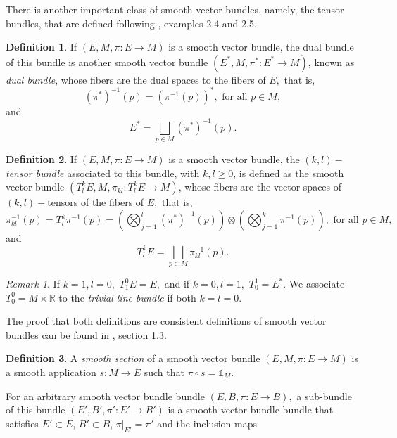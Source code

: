 \documentclass[12pt, letterpaper, reqno]{amsart}
\theoremstyle{definition}
\newtheorem{df}{Definition}
\theoremstyle{plain}
\theoremstyle{remark}
\newtheorem{rem}{Remark}
\begin{document}
There is another important class of smooth vector bundles, namely, the tensor bundles, that are defined following \cite{wendl2008lecture}, examples 2.4 and 2.5.
\begin{df} 
	If $ (E,M,\pi:E \rightarrow {M}) $ is a smooth vector bundle, the dual bundle of this bundle is another smooth vector bundle $ (E^*,M,\pi^*:E^*\rightarrow {M}) $, known as \textit{ dual bundle}, whose fibers are the dual spaces to the fibers of $ E, $ that is,
	$$ (\pi^{*})^{-1}(p)=(\pi^{-1}(p))^*, \text{ for all }p\in M,$$ 
	and $$ E^* =\bigsqcup_{p\in M} (\pi^*)^{-1}(p). $$ 
\end{df}
\begin{df}
	If $ (E,M,\pi:E \rightarrow {M}) $ is a smooth vector bundle, the \textit{$ (k,l)- $tensor bundle} associated to this bundle, with $ k,l\geq0 $, is defined as the smooth vector bundle $ (T^k_l E, M, \pi_{kl}: T^k_l E \rightarrow {M}) $, whose fibers are the vector spaces of $ (k,l) -$tensors of the fibers of $ E, $ that is,     
	$$ \pi_{kl}^{-1}(p) = T^k_l \pi^{-1}(p)=\left( \bigotimes_{j=1}^l (\pi^{*})^{-1}(p)\right)\otimes \left( \bigotimes_{j=1}^k \pi^{-1}(p) \right), \text{ for all }p\in M, $$ 
	and
	$$ T^k_l E = \bigsqcup_{p\in M} \pi_{kl}^{-1}(p). $$ 
\end{df}
\begin{rem}
	If $ k=1,l=0, $ $T^0_1E=E,$ and if $ k=0,l=1, $ $ T^1_0=E^*. $ We associate $ T^0_0=M\times \mathbb{R} $ to the \textit{trivial line bundle} if both $ k=l=0. $ 
\end{rem}

The proof that both definitions are consistent definitions of smooth vector bundles can be found in \cite{luke2013vector}, section 1.3.
\begin{df}
	A \textit{smooth section} of a smooth vector bundle $ (E,M,\pi:E \rightarrow {M}) $ is a smooth application $ s: M \rightarrow {E} $ such that $ \pi\circ s= \mathbb{1}_{M}. $    
\end{df}
For an arbitrary smooth vector bundle bundle $ (E,B,\pi:E \rightarrow {B}), $ a sub-bundle of this bundle $ (E',B',\pi':E' \rightarrow {B'}) $  is a smooth vector bundle bundle that satisfies $ E'\subset E $, $ B'\subset B $, $ \pi|_{E'}=\pi' $ and the inclusion maps 
\begin{center}
\end{center}
\end{document}

